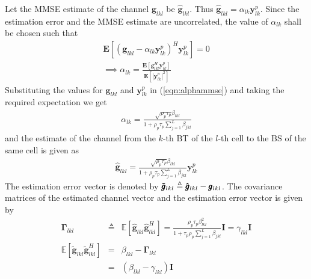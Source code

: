 \documentclass[10pt, a4paper, twoside,fleqn]{article}
\begin{document}
Let the MMSE estimate of the channel $\pmb{g}_{lkl}$ be $\pmb{\hat g}_{lkl}$. Thus $\pmb{\hat g}_{lkl} = \alpha_{lk}\pmb{y}_{lk}^{p}$. Since the estimation error and the MMSE estimate are uncorrelated, the value of $\alpha_{lk}$ shall be chosen such that
\begin{eqnarray}\label{eqn:alphammse}
	\pmb{E}[(\pmb{g}_{lkl}-\alpha_{lk}\pmb{y}_{lk}^{p})^H \pmb{y}_{lk}^{p}] = 0 \nonumber \\
	\implies \alpha_{lk} = \frac{\pmb{E}[\pmb{g}^{H}_{lkl} \pmb{y}_{lk}^{p}]}{\pmb{E}[|\pmb{y}_{lk}^{p}|^2]}
\end{eqnarray}
Substituting the values for $\pmb{g}_{lkl}$ and $\pmb{y}_{lk}^{p}$ in (\ref{eqn:alphammse}) and taking the required expectation we get
\begin{eqnarray}\label{eq:alphapll}
	\alpha_{lk}=\frac{\sqrt{\rho_p \tau_p} \beta_{lkl}}{1+\rho_p\tau_p\sum\limits_{j=1}^{L}\beta_{jkl}}
\end{eqnarray}
and the estimate of the channel from the $k$-th BT of the $l$-th cell to the BS of the same cell is given as
\begin{eqnarray}\label{eq:estimatehpll}
	\pmb{\hat g}_{lkl} = \frac{\sqrt{\rho_p\tau_p}\beta_{lkl}}{1+\rho_p\tau_p\sum\limits_{j=1}^{L}\beta_{jkl}} \pmb{y}_{lk}^{p}
\end{eqnarray}
The estimation error vector is denoted by ${\pmb{\Tilde g}_{lkl}}  \triangleq  \pmb{{\hat g}}_{lkl} - \pmb{g}_{lkl}$.
The covariance matrices of the estimated channel vector and the estimation error vector is given by
\begin{eqnarray}
	\pmb{\Gamma}_{lkl} &\triangleq & \mathbb{E}[\pmb{\hat g}_{lkl}\pmb{\hat g}^H_{lkl}]
                    =       \frac{\rho_p\tau_p\beta^2_{lkl}}{1+\tau_p\rho_p\sum\limits_{j=1}^{L}\beta_{jkl}}\pmb{I} = \gamma_{lkl}\pmb{I} \\
    \mathbb{E}[\pmb{\widetilde{g}}_{lkl} \pmb{\widetilde{g}}^H_{lkl}] &=& \beta_{lkl}-\pmb{\Gamma}_{lkl} \nonumber \\
          									    &=& (\beta_{lkl} - \gamma_{lkl})\pmb{I}
\end{eqnarray}
\end{document}
